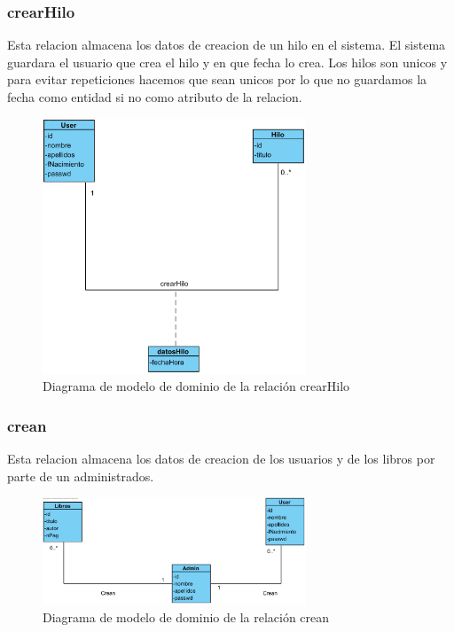 ﻿\documentclass{report}
\begin{document}
                \subsubsection{crearHilo}
                    Esta relacion almacena los datos de creacion de un hilo en el sistema. El sistema guardara el usuario que crea el hilo y en que fecha lo crea. Los hilos son unicos y para evitar repeticiones hacemos que sean unicos por lo que no guardamos la fecha como entidad si no como atributo de la relacion.
                    \begin{figure}[H]
                        \centering
                        \includegraphics[width=0.7\textwidth]{img/dominio/crearHilo.png}
                        \caption{Diagrama de modelo de dominio de la relación crearHilo}
                    \end{figure}
                \clearpage
                \subsubsection{crean}
                    Esta relacion almacena los datos de creacion de los usuarios y de los libros por parte de un administrados.
                    \begin{figure}[H]
                        \centering
                        \includegraphics[width=0.7\textwidth]{img/dominio/crean.png}
                        \caption{Diagrama de modelo de dominio de la relación crean}
                    \end{figure}
                \clearpage
\end{document}

